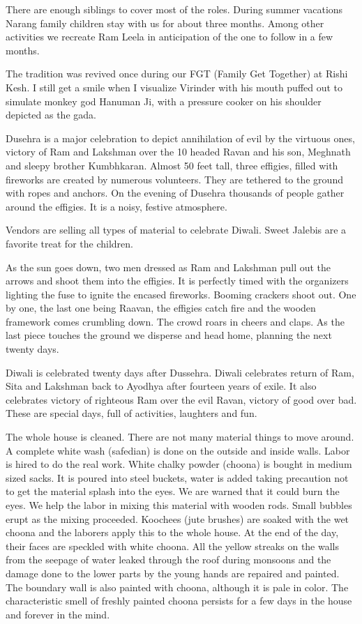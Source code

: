 There are enough siblings to cover most of the roles. During summer
vacations Narang family children stay with us for about three months.
Among other activities we recreate Ram Leela in anticipation of the one to
follow in a few months. 

The tradition was revived once during our FGT (Family Get Together) at
Rishi Kesh. I still get a smile when I visualize Virinder with his mouth
puffed out to simulate monkey god Hanuman Ji, with a pressure cooker on
his shoulder depicted as the gada. 

Dusehra is a major celebration to depict annihilation of evil by the
virtuous ones, victory of Ram and Lakshman over the 10 headed Ravan and
his son, Meghnath and sleepy brother  Kumbhkaran. Almost 50 feet tall,
three effigies, filled with fireworks are created by numerous volunteers.
They are tethered to the ground with ropes and anchors. On the evening of
Dusehra thousands of people gather around the effigies. It is a noisy,
festive atmosphere. 

Vendors are selling all types of material to celebrate Diwali. Sweet
Jalebis are a favorite treat for the children. 

As the sun goes down, two men dressed as Ram and Lakshman pull out the
arrows and shoot them into the effigies. It is perfectly timed with the
organizers lighting the fuse to ignite the encased fireworks. Booming
crackers shoot out. One by one, the last one being Raavan, the effigies
catch fire and the wooden framework comes crumbling down. The crowd roars
in cheers and claps. As the last piece touches the ground we disperse and
head home, planning the next twenty days. 

Diwali is celebrated twenty days after Dussehra. Diwali celebrates return
of Ram, Sita and Lakshman back to Ayodhya after fourteen years of exile.
It also celebrates victory of righteous Ram over the evil Ravan, victory
of good over bad. These are special days, full of activities, laughters
and fun. 

The whole house is cleaned.  There are not many material things to move
around. A complete white wash (safedian) is done on the outside and inside
walls. Labor is hired to do the real work. White chalky powder (choona) is
bought in medium sized sacks. It is poured into steel buckets, water is
added taking precaution not to get the material splash into the eyes. We
are warned that it could burn the eyes.  We help the labor in mixing this
material with wooden rods. Small bubbles erupt as the mixing proceeded.
Koochees (jute brushes) are soaked with the wet choona and the laborers
apply this to the whole house. At the end of the day, their faces are
speckled with white choona. All the yellow streaks on the walls from the
seepage of water leaked through the roof during monsoons and the damage
done to the lower parts by the young hands are repaired and painted. The
boundary wall is also painted with choona, although it is pale in color.
The characteristic smell of freshly painted choona persists for a few days
in the house and forever in the mind. 

